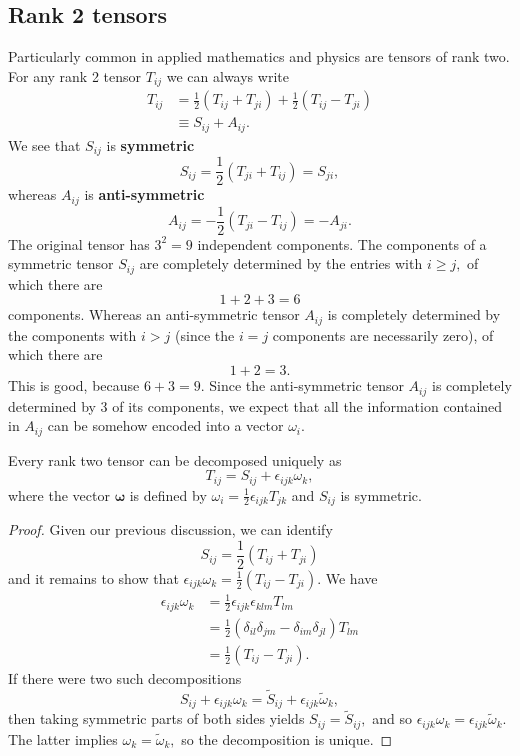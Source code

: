 \subsection{Rank 2 tensors}
Particularly common in applied mathematics and physics are tensors of rank two. For any rank 2 tensor $T_{i j}$ we can always write
\[
\begin{aligned}
T_{i j} &=\frac{1}{2}\left(T_{i j}+T_{j i}\right)+\frac{1}{2}\left(T_{i j}-T_{j i}\right) \\
& \equiv S_{i j}+A_{i j}.
\end{aligned}
\]
We see that $S_{i j}$ is \textbf{symmetric}
\[
S_{i j}=\frac{1}{2}\left(T_{j i}+T_{i j}\right)=S_{j i},
\]
whereas $A_{i j}$ is \textbf{anti-symmetric}
\[
A_{i j}=-\frac{1}{2}\left(T_{j i}-T_{i j}\right)=-A_{j i}.
\]
The original tensor has $3^{2}=9$ independent components. The components of a symmetric tensor $S_{i j}$ are completely determined by the entries with $i \geq j,$ of which there are
\[
1+2+3=6
\]
components. Whereas an anti-symmetric tensor $A_{i j}$ is completely determined by the components with $i>j$ (since the $i=j$ components are necessarily zero), of which there
are
\[
1+2=3.
\]
This is good, because $6+3=9$. Since the anti-symmetric tensor $A_{i j}$ is completely determined by 3 of its components, we expect that all the information contained in $A_{i j}$ can be somehow encoded into a vector $\omega_{i}$.

\begin{proposition}
    Every rank two tensor can be decomposed uniquely as
    \[
    T_{i j}=S_{i j}+\epsilon_{i j k} \omega_{k},
    \]
    where the vector $\boldsymbol{\omega}$ is defined by $\omega_{i}=\frac{1}{2} \epsilon_{i j k} T_{j k}$ and $S_{i j}$ is symmetric.
\end{proposition}
\begin{proof}
    Given our previous discussion, we can identify
    \[
    S_{i j}=\frac{1}{2}\left(T_{i j}+T_{j i}\right)
    \]
    and it remains to show that $\epsilon_{i j k} \omega_{k}=\frac{1}{2}\left(T_{i j}-T_{j i}\right) .$ We have
    \[
    \begin{aligned}
    \epsilon_{i j k} \omega_{k} &=\frac{1}{2} \epsilon_{i j k} \epsilon_{k l m} T_{l m} \\
    &=\frac{1}{2}\left(\delta_{i l} \delta_{j m}-\delta_{i m} \delta_{j l}\right) T_{l m} \\
    &=\frac{1}{2}\left(T_{i j}-T_{j i}\right).
    \end{aligned}
    \]
    If there were two such decompositions
    \[
    S_{i j}+\epsilon_{i j k} \omega_{k}=\tilde{S}_{i j}+\epsilon_{i j k} \tilde{\omega}_{k},
    \]
    then taking symmetric parts of both sides yields $S_{i j}=\tilde{S}_{i j},$ and so $\epsilon_{i j k} \omega_{k}=\epsilon_{i j k} \tilde{\omega}_{k} .$ The latter implies $\omega_{k}=\tilde{\omega}_{k},$ so the decomposition is unique.
\end{proof}

